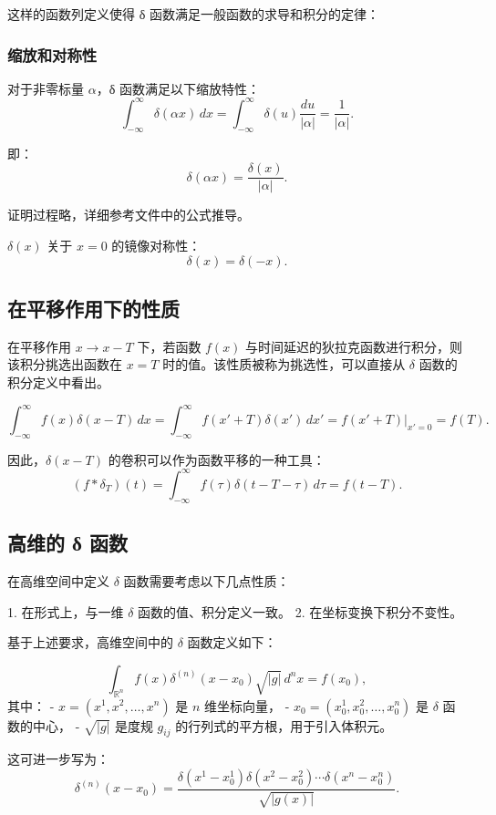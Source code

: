 \documentclass[12pt]{article}
\begin{document}
这样的函数列定义使得 δ 函数满足一般函数的求导和积分的定律：

\subsubsection*{缩放和对称性}

对于非零标量 $\alpha$，δ 函数满足以下缩放特性：
\[
\int_{-\infty}^\infty \delta(\alpha x) \, dx =
\int_{-\infty}^\infty \delta(u) \frac{du}{|\alpha|} = \frac{1}{|\alpha|}.
\]

即：
\[
\delta(\alpha x) = \frac{\delta(x)}{|\alpha|}.
\]

证明过程略，详细参考文件中的公式推导。

$\delta(x)$ 关于 $x = 0$ 的镜像对称性：
\[
\delta(x) = \delta(-x).
\]

\subsection*{在平移作用下的性质}

在平移作用 $x \to x - T$ 下，若函数 $f(x)$ 与时间延迟的狄拉克函数进行积分，则该积分挑选出函数在 $x = T$ 时的值。该性质被称为挑选性，可以直接从 $\delta$ 函数的积分定义中看出。

\[
\int_{-\infty}^\infty f(x) \delta(x - T) \, dx =
\int_{-\infty}^\infty f(x' + T) \delta(x') \, dx' = f(x' + T) \big|_{x'=0} = f(T).
\]

因此，$\delta(x - T)$ 的卷积可以作为函数平移的一种工具：
\[
(f * \delta_T)(t) = \int_{-\infty}^\infty f(\tau) \delta(t - T - \tau) \, d\tau = f(t - T).
\]

\subsection*{高维的 δ 函数}

在高维空间中定义 $\delta$ 函数需要考虑以下几点性质：

1. 在形式上，与一维 $\delta$ 函数的值、积分定义一致。
2. 在坐标变换下积分不变性。

基于上述要求，高维空间中的 $\delta$ 函数定义如下：

\[
\int_{\mathbb{R}^n} f(x) \delta^{(n)}(x - x_0) \sqrt{|g|} \, d^n x = f(x_0),
\]
其中：
- $x = (x^1, x^2, \ldots, x^n)$ 是 $n$ 维坐标向量，
- $x_0 = (x_0^1, x_0^2, \ldots, x_0^n)$ 是 $\delta$ 函数的中心，
- $\sqrt{|g|}$ 是度规 $g_{ij}$ 的行列式的平方根，用于引入体积元。

这可进一步写为：
\[
\delta^{(n)}(x - x_0) = \frac{\delta(x^1 - x_0^1) \delta(x^2 - x_0^2) \cdots \delta(x^n - x_0^n)}{\sqrt{|g(x)|}}.
\]
\end{document}
